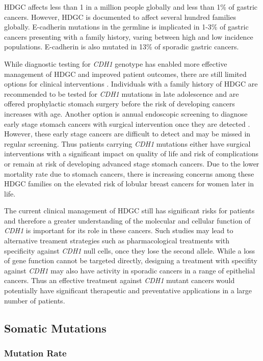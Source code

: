 HDGC affects less than 1 in a million people globally \citep{Ferlay2015} and less than 1\% of gastric cancers. However, HDGC is documented to affect several hundred families globally. E-cadherin mutations in the germline is implicated in 1-3\% of gastric cancers presenting with a family history, varing between high and low incidence populations. E-cadherin is also mutated in 13\% of sporadic gastric cancers.

While diagnostic testing for \textit{CDH1} genotype has enabled more effective management of HDGC and improved patient outcomes, there are still limited options for clinical interventions \citep{Guilford2010}. Individuals with a family history of HDGC are recommended to be tested for \textit{CDH1} mutations in late adolescence and are offered prophylactic stomach surgery before the risk of developing cancers increases with age. Another option is annual endoscopic screening to diagnose early stage stomach cancers with surgical intervention once they are detected \citep{Oliveira2013}. However, these early stage cancers are difficult to detect and may be missed in regular screening. Thus patients carrying \textit{CDH1} mutations either have surgical interventions with a significant impact on quality of life and risk of complications or remain at risk of developing advanced stage stomach cancers. Due to the lower mortality rate due to stomach cancers, there is increasing concerns among these HDGC families on the elevated risk of lobular breast cancers for women later in life.

The current clinical management of HDGC still has significant risks for patients and therefore a greater understanding of the molecular and cellular function of \textit{CDH1} is important for its role in these cancers. Such studies may lead to alternative treament strategies such as pharmacological treatments with specificity against \textit{CDH1} null cells, once they lose the second allele. While a loss of gene function cannot be targeted directly, designing a treatment with specifity against \textit{CDH1} may also have activity in sporadic cancers in a range of epithelial cancers. Thus an effective treatment against \textit{CDH1} mutant cancers would potentially have significant therapeutic and preventative applications in a large number of patients.

\subsection{Somatic Mutations}
\subsubsection{Mutation Rate}

